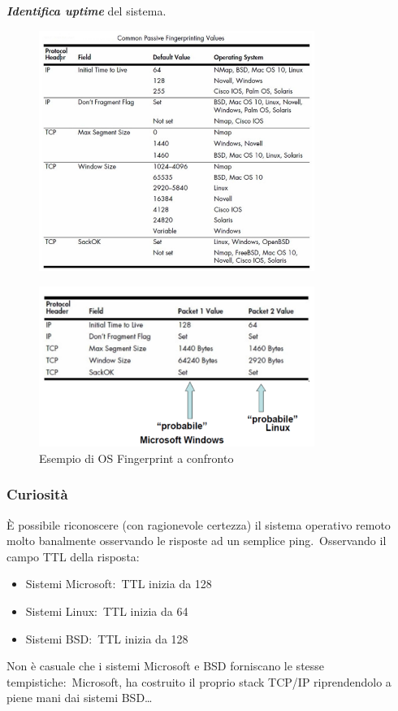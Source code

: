 \textbf{\emph{Identifica uptime}} del sistema.

\begin{figure}[H]
    \centering
    \includegraphics[width=0.8\textwidth]{immagini/Fingerprint_values.png}
\end{figure}

\begin{figure}[H]
    \centering
    \includegraphics[width=0.8\textwidth]{immagini/Fingerprint_confronto.png}
    \caption*{Esempio di OS Fingerprint a confronto}
\end{figure}

\subsubsection{Curiosità}

È possibile riconoscere (con ragionevole certezza) il sistema operativo remoto molto banalmente osservando le risposte ad un semplice ping.\
Osservando il campo TTL della risposta:
\begin{itemize}
    \item Sistemi Microsoft:\ TTL inizia da 128
    \item Sistemi Linux:\ TTL inizia da 64
    \item Sistemi BSD:\ TTL inizia da 128
\end{itemize}
Non è casuale che i sistemi Microsoft e BSD forniscano le stesse tempistiche:\ Microsoft, ha costruito il proprio stack TCP/IP riprendendolo a piene mani dai sistemi BSD\dots
